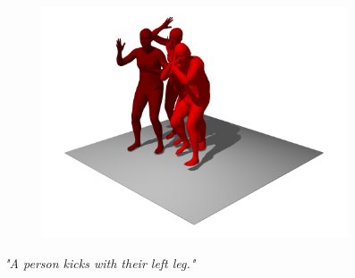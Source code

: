 \begin{figure}[H]
\begin{subfigure}{0.32\linewidth}
        \includegraphics[width=\linewidth]{figures/results/single-kick3.png}
    \end{subfigure}
    \caption{\textit{"A person kicks with their left leg."}}
    \label{fig:single-kicks}
\end{figure}

